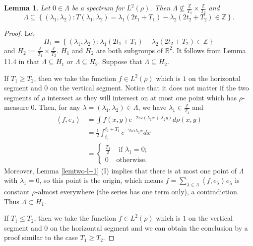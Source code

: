 \documentclass[12pt,a4paper,intlimits,sumlimits]{amsart}
\theoremstyle{plain}
\newtheorem{lemma}{Lemma}
\theoremstyle{definition}
\newcommand{\RR}{{\mathbb R}}
\newcounter{rem}
\begin{document}
\begin{lemma}\label{lemtwo-l--2}
Let $0\in\Lambda$ be a spectrum for $L^2(\rho)$. Then $\Lambda \not\subseteq \frac{\mathbb{Z}}{T_1}\times\frac{\mathbb{Z}}{T_2}$ and  
 $$\Lambda\subseteq \left\{(\lambda_1, \lambda_2 ): T( \lambda_1, \lambda_2 ) =\lambda_1\left(2 t_1+T_1\right)-\lambda_2\left(2 t_2+T_2\right)\in \mathbb{Z}\right\}.$$ 
\end{lemma}
\begin{proof}
 Let $$ H_1=\left\{(\lambda_1, \lambda_2 ):  \lambda_1\left(2 t_1+T_1\right)-\lambda_2\left(2 t_2+T_2\right)\in \mathbb{Z}\right\} $$
and
$H_2:=\frac{\mathbb{Z}}{T_1}\times\frac{\mathbb{Z}}{T_2}$.
 $H_1$ and $H_2$ are both subgroups of $\RR^2$. 
 It follows from Lemma 11.4 in \cite{GL17} that $ \Lambda \subseteq H_1$ or $\Lambda \subseteq H_2$.
Suppose that $\Lambda \subseteq H_2$.

If $T_1\geq T_2$, then we 
take the function $f \in L^2(\rho)$ which is $1$ on the horizontal segment and $0$ on the vertical segment.  Notice that it does not matter if the two segments of $\rho$ intersect as they will intersect on at most one point which has $\rho$-measure 0. Then, for any $\lambda=(\lambda_1, \lambda_2 )\in\Lambda$, we have $\lambda_1\in\frac{\mathbb{Z}}{T_1}$ and 
$$
\begin{aligned}
\left\langle f, e_\lambda\right\rangle & =\int f(x, y) e^{-2 \pi i\left(\lambda_1 x+\lambda_2 y\right)} d \rho(x, y) \\
& =\frac{1}{2} \int_{t_1}^{t_1+T_1} e^{-2 \pi i \lambda_1 x} d x \\
& = \begin{cases} \frac{T_1}{2} & \text { if } \lambda_1=0; \\
0 & \text {otherwise.}\end{cases} 
\end{aligned}
$$
Moreover, Lemma \ref{lemtwo-l--1} (I) implies that there is at most one point of $\Lambda$ with $\lambda_1=0$, so this point is the origin, which means $  f=\sum_{\lambda \in \Lambda}\left\langle f, e_\lambda\right\rangle e_\lambda$ is constant $\rho$-almost everywhere  (the series has one term only), a contradiction.  Thus $\Lambda \subset H_1$. 

If $T_1\leq T_2$, then we 
take the function $f \in L^2(\rho)$ which is $1$ on the vertical segment and $0$ on the horizontal  segment  and we can obtain the conclusion  by   a proof similar to the case $T_1\geq T_2$. 

\end{proof}
 
\end{document}
